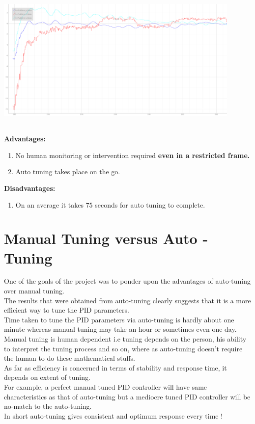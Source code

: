 \documentclass[a4paper,12pt,oneside]{book}
\begin{document}
\begin{enumerate}
\includegraphics[width = 12cm , height= 7cm]{Autotune_iteration_2.png}

\end{enumerate}
\pagebreak
\textbf{Advantages:}\vspace{1em}
           	\begin{enumerate}
           	    \item No human monitoring or intervention required \textbf{even in a restricted frame.}
           	    \item Auto tuning takes place on the go.
           	\end{enumerate}
           	
           	
           	\textbf{Disadvantages:}
           	
           	
           	\begin{enumerate}
           	    \item On an average it takes 75 seconds for auto tuning to complete.
           	\end{enumerate}


\section{Manual Tuning versus Auto - Tuning }
One of the goals of the project was to ponder upon the advantages of auto-tuning over manual tuning.\\
The results that were obtained from auto-tuning clearly suggests that it is a more efficient way to tune the PID parameters.\\
Time taken to tune the PID parameters via auto-tuning is hardly about one minute whereas manual tuning may take an hour or sometimes even one day.\\
Manual tuning is human dependent i.e tuning depends on the person, his ability to interpret the tuning process and so on, where as auto-tuning doesn't require the human to do these mathematical stuffs.\\
As far as efficiency is concerned in terms of stability and response time, it depends on extent of tuning.\\
For example, a perfect manual tuned PID controller will have same characteristics as that of auto-tuning but a mediocre tuned PID controller will be no-match to the auto-tuning.\\
In short auto-tuning gives consistent and optimum response every time !
\end{document}
